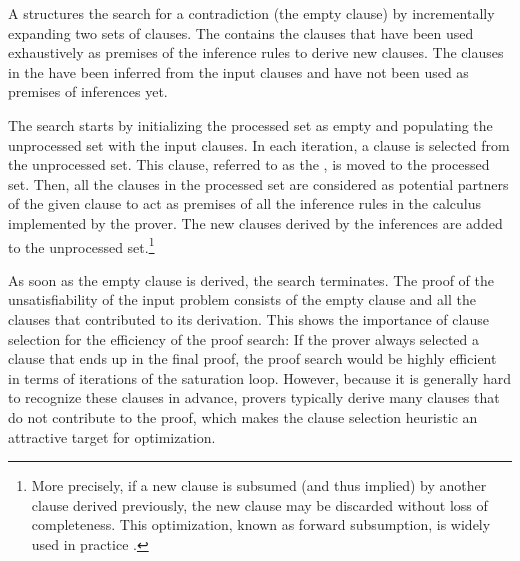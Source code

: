 A  structures the search for a contradiction
(the empty clause)
by incrementally expanding two sets of clauses.
The  contains the clauses that
have been used exhaustively as premises of the inference rules to derive new clauses.
The clauses in the  have been inferred from the input clauses and have not been used as premises of inferences yet.

The search starts by initializing the processed set as empty and populating the unprocessed set with the input clauses.
In each iteration,
a clause is selected from the unprocessed set.
This clause, referred to as the , is moved to the processed set.
Then, all the clauses in the processed set are considered as potential partners of the given clause
to act as premises of all the inference rules in the calculus implemented by the prover.
The new clauses derived by the inferences are added to the unprocessed set.\footnote{More precisely, if a new clause is subsumed (and thus implied) by another clause derived previously, the new clause may be discarded without loss of completeness. This optimization, known as forward subsumption, is widely used in practice \cite{DBLP:journals/corr/cs-SC-0310056,DBLP:journals/jar/Voronkov95,DBLP:books/daglib/0022394}.}

As soon as the empty clause is derived, the search terminates.
The proof of the unsatisfiability of the input problem consists of the empty clause and all the clauses that contributed to its derivation.
This shows the importance of clause selection for the efficiency of the proof search:
If the prover always selected a clause that ends up in the final proof,
the proof search would be highly efficient in terms of iterations of the saturation loop.
However, because it is generally hard to recognize these clauses in advance, provers typically derive many clauses that do not contribute to the proof,
which makes the clause selection heuristic an attractive target for optimization.

